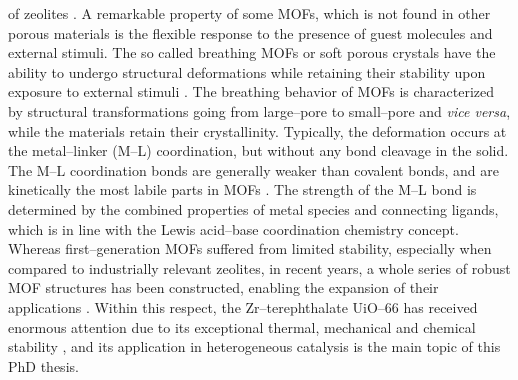 of zeolites \cite{Llabres2013}. A remarkable property of some MOFs, which is not
found in other porous materials is the flexible response to the presence of guest
molecules and external stimuli. The so called breathing MOFs or soft porous
crystals have the ability to undergo structural deformations while retaining
their stability upon exposure to external stimuli \cite{Horike2009,
Schneemann2014}. The breathing behavior of MOFs is characterized by structural
transformations going from large--pore to small--pore and \textit{vice versa},
while the materials retain their crystallinity. Typically, the deformation
occurs at the metal--linker (M--L) coordination, but without any bond cleavage in the solid. The M--L coordination bonds are
generally weaker than covalent bonds, and are kinetically the most labile parts in
MOFs \cite{Bennett2017, Morris2017}. The strength of the M--L bond is determined
by the combined properties of metal species and connecting ligands, which is in
line with the Lewis acid--base coordination chemistry concept. Whereas
first--generation MOFs suffered from limited stability, especially when compared
to industrially relevant zeolites, in recent years, a whole series of robust MOF
structures has been constructed, enabling the expansion of their
applications \cite{Burtch2014, Bai2016, Liu2017}. Within this respect, the
Zr--terephthalate UiO--66 has received
enormous attention due to its exceptional thermal, mechanical and chemical
stability \cite{Cavka2008, Valenzano2011, Wu2013}, and its application in
heterogeneous catalysis is the main topic of this PhD thesis.


